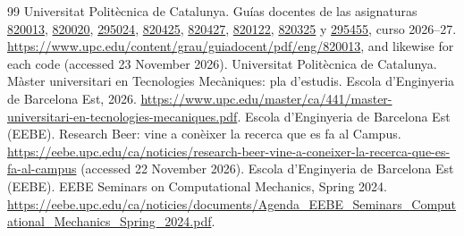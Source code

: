 \documentclass[11pt]{article}
\begin{document}
\begin{thebibliography}{99}
 Universitat Polit\`ecnica de Catalunya. Gu\'ias docentes de las asignaturas \href{https://www.upc.edu/content/grau/guiadocent/pdf/eng/820013}{820013}, \href{https://www.upc.edu/content/grau/guiadocent/pdf/eng/820020}{820020}, \href{https://www.upc.edu/content/grau/guiadocent/pdf/eng/295024}{295024}, \href{https://www.upc.edu/content/grau/guiadocent/pdf/eng/820425}{820425}, \href{https://www.upc.edu/content/grau/guiadocent/pdf/eng/820427}{820427}, \href{https://www.upc.edu/content/grau/guiadocent/pdf/eng/820122}{820122}, \href{https://www.upc.edu/content/grau/guiadocent/pdf/eng/820325}{820325} y \href{https://www.upc.edu/content/grau/guiadocent/pdf/eng/295455}{295455}, curso 2026--27. \url{https://www.upc.edu/content/grau/guiadocent/pdf/eng/820013}, and likewise for each code (accessed 23 November 2026).
 Universitat Polit\`ecnica de Catalunya. M\`aster universitari en Tecnologies Mec\`aniques: pla d'estudis. Escola d'Enginyeria de Barcelona Est, 2026. \url{https://www.upc.edu/master/ca/441/master-universitari-en-tecnologies-mecaniques.pdf}.
 Escola d'Enginyeria de Barcelona Est (EEBE). Research Beer: vine a con\`eixer la recerca que es fa al Campus. {\def\UrlBreaks{\do\/\do\-}\url{https://eebe.upc.edu/ca/noticies/research-beer-vine-a-coneixer-la-recerca-que-es-fa-al-campus}} (accessed 22 November 2026).
 Escola d'Enginyeria de Barcelona Est (EEBE). EEBE Seminars on Computational Mechanics, Spring 2024. {\def\UrlBreaks{\do\/\do\-}\url{https://eebe.upc.edu/ca/noticies/documents/Agenda_EEBE_Seminars_Computational_Mechanics_Spring_2024.pdf}}.
\end{thebibliography}
\end{document}
